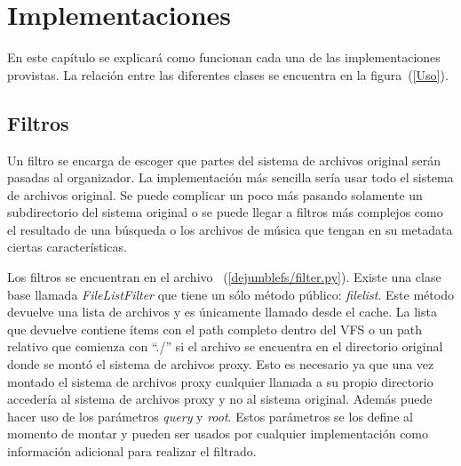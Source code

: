 \chapter{Implementaciones}
\ifpdf
    \graphicspath{{Chapter2/Chapter2Figs/PNG/}{Chapter2/Chapter2Figs/PDF/}{Chapter2/Chapter2Figs/}}
\else
    \graphicspath{{Chapter2/Chapter2Figs/EPS/}{Chapter2/Chapter2Figs/}}
\fi

En este capítulo se explicará como funcionan cada una de las implementaciones provistas. La relación entre las diferentes clases se encuentra en la figura~(\ref{Uso}).




\section{Filtros}

Un filtro se encarga de escoger que partes del sistema de archivos original serán pasadas al organizador. La implementación más sencilla sería usar todo el sistema de archivos original. Se puede complicar un poco más pasando solamente un subdirectorio del sistema original o se puede llegar a filtros más complejos como el resultado de una búsqueda o los archivos de música que tengan en su metadata ciertas características.


Los filtros se encuentran en el archivo ~(\ref{dejumblefs/filter.py}). Existe una clase base llamada \textit{FileListFilter} que tiene un sólo método público: \textit{filelist}. Este método devuelve una lista de archivos y es únicamente llamado desde el cache. La lista que devuelve contiene ítems con el path completo dentro del VFS o un path relativo que comienza con ``./'' si el archivo se encuentra en el directorio original donde se montó el sistema de archivos proxy. Esto es necesario ya que una vez montado el sistema de archivos proxy cualquier llamada a su propio directorio accedería al sistema de archivos proxy y no al sistema original. Además puede hacer uso de los parámetros \textit{query} y \textit{root}. Estos parámetros se los define al momento de montar y pueden ser usados por cualquier implementación como información adicional para realizar el filtrado.

